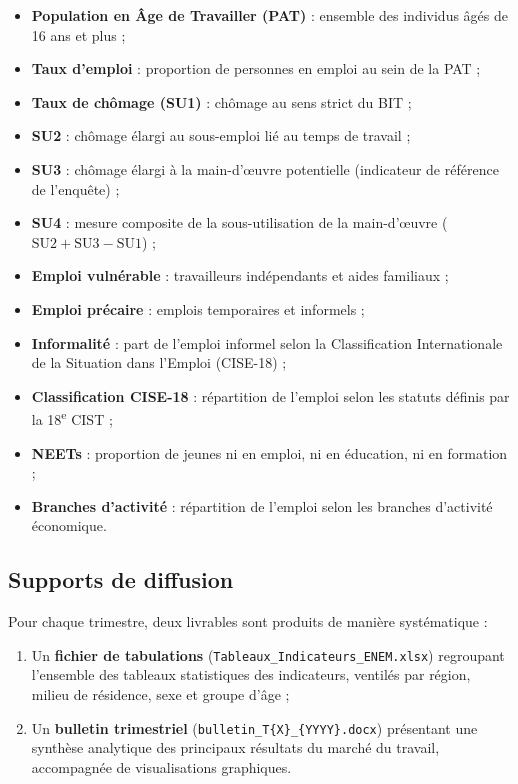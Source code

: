 \documentclass[12pt, a4paper]{article}
\begin{document}
\begin{itemize}[noitemsep]
  \item \textbf{Population en Âge de Travailler (PAT)} : ensemble des individus âgés de 16 ans et plus ;
  \item \textbf{Taux d'emploi} : proportion de personnes en emploi au sein de la PAT ;
  \item \textbf{Taux de chômage (SU1)} : chômage au sens strict du BIT ;
  \item \textbf{SU2} : chômage élargi au sous-emploi lié au temps de travail ;
  \item \textbf{SU3} : chômage élargi à la main-d'\oe{}uvre potentielle (indicateur de référence de l'enquête) ;
  \item \textbf{SU4} : mesure composite de la sous-utilisation de la main-d'\oe{}uvre ($\text{SU2} + \text{SU3} - \text{SU1}$) ;
  \item \textbf{Emploi vulnérable} : travailleurs indépendants et aides familiaux ;
  \item \textbf{Emploi précaire} : emplois temporaires et informels ;
  \item \textbf{Informalité} : part de l'emploi informel selon la Classification Internationale de la Situation dans l'Emploi (CISE-18) ;
  \item \textbf{Classification CISE-18} : répartition de l'emploi selon les statuts définis par la 18\textsuperscript{e} CIST ;
  \item \textbf{NEETs} : proportion de jeunes ni en emploi, ni en éducation, ni en formation ;
  \item \textbf{Branches d'activité} : répartition de l'emploi selon les branches d'activité économique.
\end{itemize}

\subsection{Supports de diffusion}

Pour chaque trimestre, deux livrables sont produits de manière systématique :

\begin{enumerate}[label=(\roman*), noitemsep]
  \item Un \textbf{fichier de tabulations} (\texttt{Tableaux\_Indicateurs\_ENEM.xlsx}) regroupant l'ensemble des tableaux statistiques des indicateurs, ventilés par région, milieu de résidence, sexe et groupe d'âge ;
  \item Un \textbf{bulletin trimestriel} (\texttt{bulletin\_T\{X\}\_\{YYYY\}.docx}) présentant une synthèse analytique des principaux résultats du marché du travail, accompagnée de visualisations graphiques.
\end{enumerate}
\end{document}
